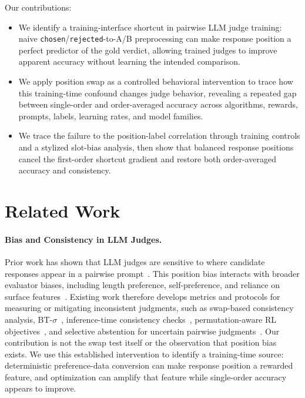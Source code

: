 \documentclass[letterpaper]{article}
\begin{document}
Our contributions:
\begin{itemize}
\item We identify a training-interface shortcut in pairwise LLM judge training: naive \texttt{chosen}/\texttt{rejected}-to-A/B preprocessing can make response position a perfect predictor of the gold verdict, allowing trained judges to improve apparent accuracy without learning the intended comparison.
\item We apply position swap as a controlled behavioral intervention to trace how this training-time confound changes judge behavior, revealing a repeated gap between single-order and order-averaged accuracy across algorithms, rewards, prompts, labels, learning rates, and model families.
\item We trace the failure to the position-label correlation through training controls and a stylized slot-bias analysis, then show that balanced response positions cancel the first-order shortcut gradient and restore both order-averaged accuracy and consistency.
\end{itemize}

\section{Related Work}

\paragraph{Bias and Consistency in LLM Judges.}
Prior work has shown that LLM judges are sensitive to where candidate responses appear in a pairwise prompt~\citep{zheng2023judging,wang2024largelanguagemodels,zhu2024judgebench}. This position bias interacts with broader evaluator biases, including length preference, self-preference, and reliance on surface features~\citep{wu2024style,koo2024benchmarking,li2024quantifying,park2024disentangling,singhal2024long}. Existing work therefore develops metrics and protocols for measuring or mitigating inconsistent judgments, such as swap-based consistency analysis, BT-$\sigma$~\citep{btsigma2026}, inference-time consistency checks~\citep{trustjudge2026}, permutation-aware RL objectives~\citep{eisgrpo2026,pagrpo2026}, and selective abstention for uncertain pairwise judgments~\citep{scope2026}. Our contribution is not the swap test itself or the observation that position bias exists. We use this established intervention to identify a training-time source: deterministic preference-data conversion can make response position a rewarded feature, and optimization can amplify that feature while single-order accuracy appears to improve.
\end{document}
